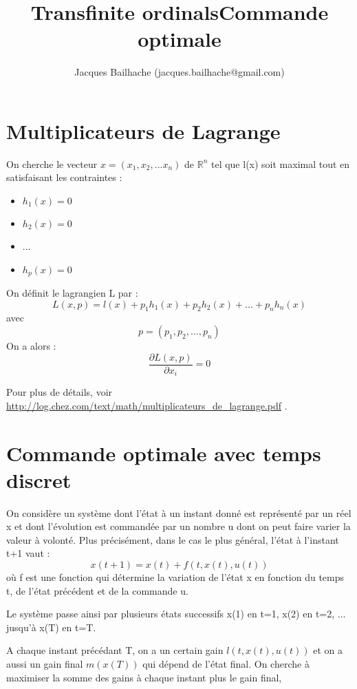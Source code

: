 \documentclass[10pt]{article}
\title{Transfinite ordinals}
\begin{document}
\title{Commande optimale}
\author{Jacques Bailhache (jacques.bailhache@gmail.com)}

\maketitle

\setlength{\parindent}{0pt}

\section{Multiplicateurs de Lagrange}

On cherche le vecteur \( x = (x_1, x_2, ... x_n) \) de \( \mathbb{R}^n \) tel que l(x) soit maximal tout en satisfaisant les contraintes :
\begin{itemize}
     \setlength{\itemsep}{1pt}
     \setlength{\parskip}{0pt}
     \setlength{\parsep}{0pt}
\item \( h_1(x) = 0 \)
\item \( h_2(x) = 0 \)
\item ...
\item \( h_p(x) = 0 \)
\end{itemize}

On définit le lagrangien L par : 
\[ L(x,p) = l(x) + p_1 h_1(x) + p_2 h_2(x) + ... + p_n h_n(x) \]
avec
\[ p = (p_1, p_2, ... , p_n) \]
On a alors :
\[ \frac{\partial L(x,p)}{\partial x_i} = 0 \]

Pour plus de détails, voir \url{http://log.chez.com/text/math/multiplicateurs_de_lagrange.pdf} .

\section{Commande optimale avec temps discret}

On considère un système dont l'état à un instant donné est représenté par un réel x et dont l'évolution est commandée par un nombre u dont on peut faire varier la valeur à volonté. Plus précisément, dans le cas le plus général, l'état à l'instant t+1 vaut :
\[ x(t+1) = x(t) + f(t,x(t),u(t)) \]
où f est une fonction qui détermine la variation de l'état x en fonction du temps t, de l'état précédent et de la commande u.

Le système passe ainsi par plusieurs états successifs x(1) en t=1, x(2) en t=2, ... jusqu'à x(T) en t=T.

A chaque instant précédant T, on a un certain gain \( l(t,x(t),u(t)) \) et on a aussi un gain final \( m(x(T)) \) qui dépend de l'état final.
On cherche à maximiser la somme des gains à chaque instant plus le gain final, 
\end{document}
